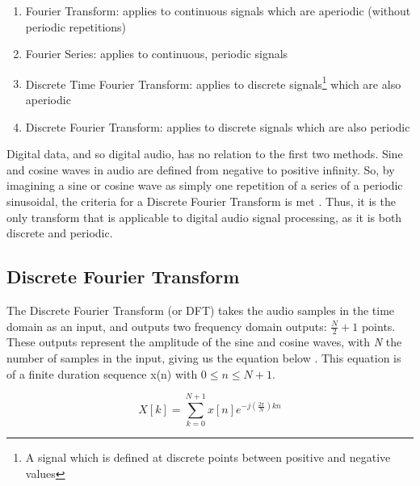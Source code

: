 \begin{enumerate}
    \item Fourier Transform: applies to continuous signals which are aperiodic (without periodic repetitions)
    \item Fourier Series: applies to continuous, periodic signals
    \item Discrete Time Fourier Transform: applies to discrete signals\footnote{A signal which is defined at discrete points between positive and negative values} which are also aperiodic
    \item Discrete Fourier Transform: applies to discrete signals which are also periodic
\end{enumerate}

Digital data, and so digital audio, has no relation to the first two methods. Sine and cosine waves in audio are defined from negative to positive infinity. So, by imagining a sine or cosine wave as simply one repetition of a series of a periodic sinusoidal, the criteria for a Discrete Fourier Transform is met \cite{Zjalic_2021}. Thus, it is the only transform that is applicable to digital audio signal processing, as it is both discrete and periodic.

\subsection{Discrete Fourier Transform}
The Discrete Fourier Transform (or DFT) takes the audio samples in the time domain as an input, and outputs two frequency domain outputs: $\frac{N}{2} + 1$ points. These outputs represent the amplitude of the sine and cosine waves, with \textit{N} the number of samples in the input, giving us the equation below \cite{Gold_Morgan_Ellis_2011}. This equation is of a finite duration sequence x(n)
with $0 \leq n \leq N + 1$.

\begin{equation}\label{eq:dft-equation}
    X[k] = \sum_{k=0}^{N+1}x[n]e^{-j (\frac{2\pi}{N})kn}
\end{equation}



